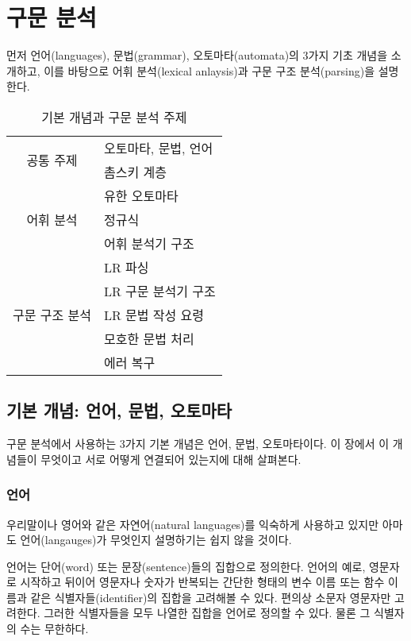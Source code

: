 \documentclass[a4paper]{book}
\begin{document}
\chapter{구문 분석}

먼저 언어(languages), 문법(grammar), 오토마타(automata)의 3가지 기초
개념을 소개하고, 이를 바탕으로 어휘 분석(lexical anlaysis)과 구문 구조
분석(parsing)을 설명한다.

\begin{table}[ht]
\begin{center}
\begin{tabular}{|c|l|} \hline
  \multirow{2}{*}{공통 주제}
    & 오토마타, 문법, 언어 \\ \cline{2-2}
    & 촘스키 계층 \\ \hline
  \multirow{3}{*}{어휘 분석} & 유한 오토마타 \\ \cline{2-2}
    & 정규식 \\ \cline{2-2}
    & 어휘 분석기 구조 \\ \hline
  \multirow{5}{*}{구문 구조 분석}
    & LR 파싱 \\ \cline{2-2}
    & LR 구문 분석기 구조 \\ \cline{2-2}
    & LR 문법 작성 요령 \\ \cline{2-2}
    & 모호한 문법 처리 \\ \cline{2-2}
    & 에러 복구 \\ \hline
\end{tabular}
\caption{기본 개념과 구문 분석 주제}
\label{table:syntaxanalysis}
\end{center}
\end{table}


\section{기본 개념: 언어, 문법, 오토마타}


구문 분석에서 사용하는 3가지 기본 개념은 언어, 문법, 오토마타이다. 이
장에서 이 개념들이 무엇이고 서로 어떻게 연결되어 있는지에 대해 살펴본다.

\subsection{언어}

우리말이나 영어와 같은 자연어(natural languages)를 익숙하게 사용하고
있지만 아마도 언어(langauges)가 무엇인지 설명하기는 쉽지 않을 것이다.

언어는 단어(word) 또는 문장(sentence)들의 집합으로 정의한다. 언어의
예로, 영문자로 시작하고 뒤이어 영문자나
숫자가 반복되는 간단한 형태의 변수 이름 또는 함수 이름과 같은
식별자들(identifier)의 집합을 고려해볼 수 있다.
%
편의상 소문자 영문자만 고려한다. 그러한 식별자들을 모두 나열한 집합을
언어로 정의할 수 있다. 물론 그 식별자의 수는 무한하다.
\end{document}
